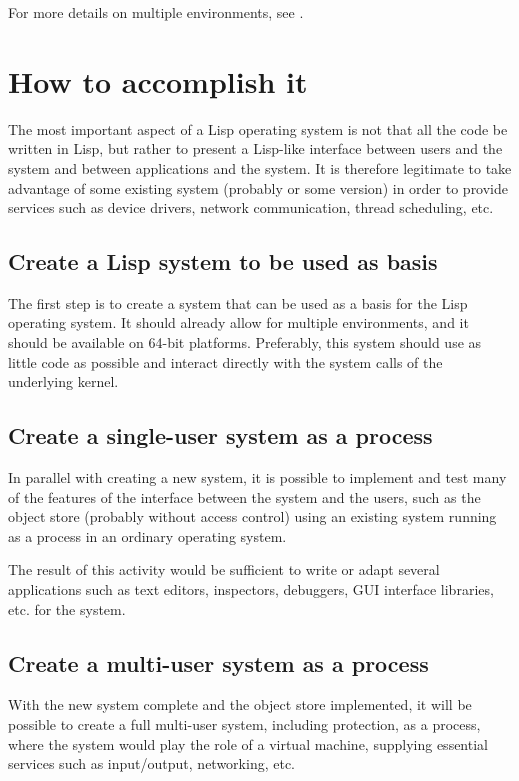 For more details on multiple environments, see
.

\section{How to accomplish it}

The most important aspect of a Lisp operating system is not that all
the code be written in Lisp, but rather to present a Lisp-like
interface between users and the system and between applications and
the system.  It is therefore legitimate to take advantage of some
existing system (probably \linux{} or some \bsd{} version) in order to
provide services such as device drivers, network communication, thread
scheduling, etc.

\subsection{Create a Lisp system to be used as basis}

The first step is to create a \cl{} system that can be used as a basis
for the Lisp operating system.  It should already allow for multiple
environments, and it should be available on 64-bit platforms.
Preferably, this system should use as little \clanguage{} code as
possible and interact directly with the system calls of the underlying
kernel.

\subsection{Create a single-user system as a \unix{} process}

In parallel with creating a new \cl{} system, it is possible to
implement and test many of the features of the interface between the
system and the users, such as the object store (probably without
access control) using an existing \cl{} system running as a process in
an ordinary operating system.  

The result of this activity would be sufficient to write or adapt
several applications such as text editors, inspectors, debuggers, GUI
interface libraries, etc. for the system.

\subsection{Create a multi-user system as a \unix{} process}

With the new \cl{} system complete and the object store implemented,
it will be possible to create a full multi-user system, including
protection, as a \unix{} process, where the \unix{} system would play
the role of a virtual machine, supplying essential services such as
input/output, networking, etc. 

